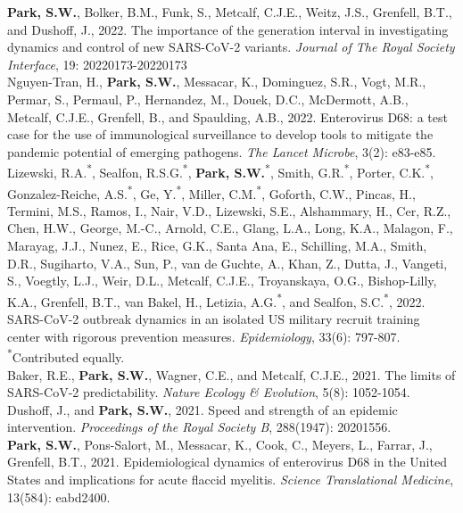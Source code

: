 \documentclass[11pt]{article} %
\begin{document}
 \textbf{Park, S.W.}, Bolker, B.M., Funk, S., Metcalf, C.J.E., Weitz, J.S., Grenfell, B.T., and Dushoff, J., 2022. The importance of the generation interval in investigating dynamics and control of new SARS-CoV-2 variants. \textit{Journal of The Royal Society Interface}, 19: 20220173-20220173\\

 Nguyen-Tran, H., \textbf{Park, S.W.}, Messacar, K., Dominguez, S.R., Vogt, M.R., Permar, S., Permaul, P., Hernandez, M., Douek, D.C., McDermott, A.B., Metcalf, C.J.E., Grenfell, B., and Spaulding, A.B., 2022. Enterovirus D68: a test case for the use of immunological surveillance to develop tools to mitigate the pandemic potential of emerging pathogens. \textit{The Lancet Microbe}, 3(2): e83-e85.\\

 Lizewski, R.A.\textsuperscript{*}, Sealfon, R.S.G.\textsuperscript{*}, \textbf{Park, S.W.}\textsuperscript{*}, Smith, G.R.\textsuperscript{*}, Porter, C.K.\textsuperscript{*}, Gonzalez-Reiche, A.S.\textsuperscript{*}, Ge, Y.\textsuperscript{*}, Miller, C.M.\textsuperscript{*}, Goforth, C.W., Pincas, H., Termini, M.S., Ramos, I., Nair, V.D., Lizewski, S.E., Alshammary, H., Cer, R.Z., Chen, H.W., George, M.-C., Arnold, C.E., Glang, L.A., Long, K.A., Malagon, F., Marayag, J.J., Nunez, E., Rice, G.K., Santa Ana, E., Schilling, M.A., Smith, D.R., Sugiharto, V.A., Sun, P., van de Guchte, A., Khan, Z., Dutta, J., Vangeti, S., Voegtly, L.J., Weir, D.L., Metcalf, C.J.E., Troyanskaya, O.G., Bishop-Lilly, K.A., Grenfell, B.T., van Bakel, H., Letizia, A.G.\textsuperscript{*}, and Sealfon, S.C.\textsuperscript{*}, 2022. SARS-CoV-2 outbreak dynamics in an isolated US military recruit training center with rigorous prevention measures. \textit{Epidemiology}, 33(6): 797-807.\\
\textsuperscript{*}Contributed equally.\\

 Baker, R.E., \textbf{Park, S.W.}, Wagner, C.E., and Metcalf, C.J.E., 2021. The limits of SARS-CoV-2 predictability. \textit{Nature Ecology \& Evolution}, 5(8): 1052-1054.\\

 Dushoff, J., and \textbf{Park, S.W.}, 2021. Speed and strength of an epidemic intervention. \textit{Proceedings of the Royal Society B}, 288(1947): 20201556.\\

 \textbf{Park, S.W.}, Pons-Salort, M., Messacar, K., Cook, C., Meyers, L., Farrar, J., Grenfell, B.T., 2021. Epidemiological dynamics of enterovirus D68 in the United States and implications for acute flaccid myelitis. \textit{Science Translational Medicine}, 13(584): eabd2400.\\
\end{document}
